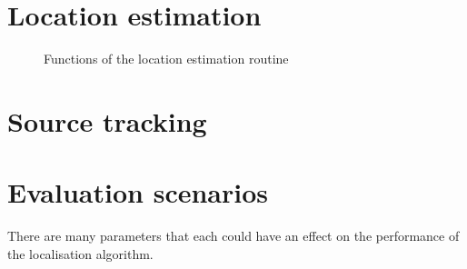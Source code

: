 %

\section{Location estimation}
\begin{figure}[H]
	\centering
	
	\caption{Functions of the location estimation routine}
	\label{diag:locEstFunc}
\end{figure}



\section{Source tracking}
\section{Evaluation scenarios}
There are many parameters that each could have an effect on the performance of the localisation algorithm.

